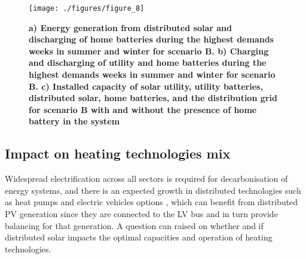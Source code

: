 \documentclass[review]{elsarticle}
\begin{document}
\begin{figure}
   \texttt{[image: ./figures/figure\_8]}
   \caption{\textbf{a) Energy generation from distributed solar and discharging of home batteries during the highest demands weeks in summer and winter for scenario B. b) Charging and discharging of utility and home batteries during the highest demands weeks in summer and winter for scenario B. c) Installed capacity of solar utility, utility batteries, distributed solar, home batteries, and the distribution grid for scenario B with and without the presence of home battery in the system}}
   \label{fig:battery}
\end{figure}

\subsection{Impact on heating technologies mix}


Widespread electrification across all sectors is required for decarbonisation of energy systems, and there is an expected growth in distributed technologies such as heat pumps and electric vehicles options \cite{IEA_globalEV}, which can benefit from distributed PV generation since they are connected to the LV bus and in turn provide balancing for that generation. A question can raised on whether and if distributed solar impacts the optimal capacities and operation of heating technologies. 
\end{document}
